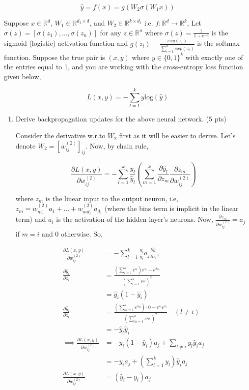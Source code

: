 \documentclass[a4paper]{article}
\theoremstyle{definition}
\newenvironment{soln}{
    \leavevmode\color{blue}\ignorespaces
}{}
\begin{document}
\[
\hat{y} = f(x) = g(W_2\sigma(W_1x))
\]

Suppose $x \in \mathbb{R}^d$, $W_1 \in \mathbb{R}^{d_1 \times d}$, and $W_2 \in \mathbb{R}^{k \times d_1}$ i.e. $f: \mathbb{R}^d \rightarrow \mathbb{R}^k$, Let $\sigma(z) = [\sigma(z_1), ..., \sigma(z_n)]$ for any $z \in \mathbb{R}^n$ where $\sigma(z) = \frac{1}{1 + e^{-z}}$ is the sigmoid (logistic) activation function and $g(z_i) = \frac{exp(z_i)}{\sum_{i=1}^k exp(z_i)}$ is the softmax function. Suppose the true pair is $(x, y)$ where $y \in \{0, 1\}^k$ with exactly one of the entries equal to 1, and you are working with the cross-entropy loss function given below,

\[
L(x, y) = -\sum_{l=1}^k y \text{log}(\hat{y})
\]

\begin{enumerate}
    \item Derive backpropagation updates for the above neural network. (5 pts) \\
    \begin{soln}
    Consider the derivative w.r.to $W_2$ first as it will be easier to derive. Let's denote $W_2 = \left[ w_{ij}^{(2)} \right]_{ij}$. Now, by chain rule,

    \begin{equation*}
        \frac{\partial L(x, y)}{\partial w_{ij}^{(2)}} = - \sum\limits_{l = 1}^{k} \frac{y_l}{\hat{y}_l} \left( \sum\limits_{m = 1}^{k} \frac{\partial \hat{y}_l}{\partial z_m} \frac{\partial z_m}{\partial w_{ij}^{(2)}} \right)
    \end{equation*}

    where $z_m$ is the linear input to the output neuron, i.e, $z_m = w_{m1}^{(2)} a_{1} + \ldots + w_{m d_1}^{(2)} a_{d_1}$ (where the bias term is implicit in the linear term) and $a_{i}$ is the activation of the hidden layer's neurons. Now, $\frac{\partial z_m}{\partial w_{ij}^{(2)}} = a_{j}$ if $m = i$ and $0$ otherwise. So,

    \begin{align*}
        \frac{\partial L(x, y)}{\partial w_{ij}^{(2)}} &= - \sum\limits_{l = 1}^{k} \frac{y_l}{\hat{y}_l} a_{j} \frac{\partial \hat{y}_l}{\partial z_i}, \\
        \frac{\partial \hat{y}_i}{\partial z_i} &= \frac{\left( \sum\limits_{l = 1}^{k} e^{z_l} \right) e^{z_i} - e^{2z_i} }{\left( \sum\limits_{l = 1}^{k} e^{z_l} \right)^2} \\
        &= \hat{y}_i (1 - \hat{y}_i) \\
        \frac{\partial \hat{y}_l}{\partial z_i} &= \frac{\left( \sum\limits_{m = 1}^{k} e^{z_m} \right) \cdot 0 - e^{z_i} e^{z_l} }{\left( \sum\limits_{m = 1}^{k} e^{z_m} \right)^2} \quad (l \neq i) \\
        &= -\hat{y}_l \hat{y}_i \\
        \implies \frac{\partial L(x, y)}{\partial w_{ij}^{(2)}} &= - y_i (1- \hat{y}_i) a_j + \sum\limits_{l \neq i} y_l \hat{y}_i a_j \\
        &= -y_ia_j + \left(\sum_{l = 1}^{k} y_l \right) \hat{y}_i a_j \\
        \frac{\partial L(x, y)}{\partial w_{ij}^{(2)}} &= (\hat{y}_i - y_i) a_j
    \end{align*}


\end{soln}
\end{enumerate}
\end{document}
